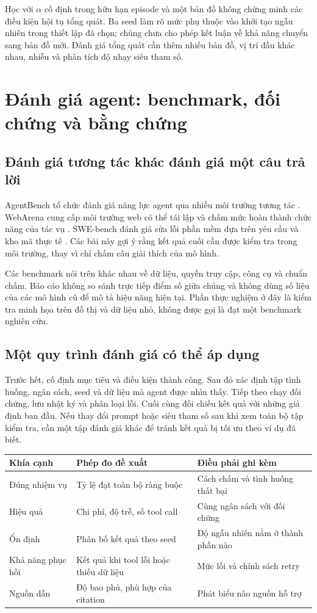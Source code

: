 Học với $\alpha$ cố định trong hữu hạn episode và một bản đồ không chứng minh các điều
kiện hội tụ tổng quát. Ba seed làm rõ mức phụ thuộc vào khởi tạo ngẫu nhiên trong
thiết lập đã chọn; chúng chưa cho phép kết luận về khả năng chuyển sang bản đồ mới.
Đánh giá tổng quát cần thêm nhiều bản đồ, vị trí đầu khác nhau, nhiễu và phân tích
độ nhạy siêu tham số.

\par
\section{Đánh giá agent: benchmark, đối chứng và bằng chứng}
\subsection{Đánh giá tương tác khác đánh giá một câu trả lời}
AgentBench tổ chức đánh giá năng lực agent qua nhiều môi trường tương tác
\cite{agentbench}. WebArena cung cấp môi trường web có thể tái lập và chấm mức hoàn
thành chức năng của tác vụ \cite{webarena}. SWE-bench đánh giá sửa lỗi phần mềm dựa
trên yêu cầu và kho mã thực tế \cite{swebench}. Các bài này gợi ý rằng kết quả cuối
cần được kiểm tra trong môi trường, thay vì chỉ chấm câu giải thích của mô hình.

Các benchmark nói trên khác nhau về dữ liệu, quyền truy cập, công cụ và chuẩn chấm.
Báo cáo không so sánh trực tiếp điểm số giữa chúng và không dùng số liệu của các mô
hình cũ để mô tả hiệu năng hiện tại. Phần thực nghiệm ở đây là kiểm tra minh họa trên
đồ thị và dữ liệu nhỏ, không được gọi là đạt một benchmark nghiên cứu.

\subsection{Một quy trình đánh giá có thể áp dụng}
Trước hết, cố định mục tiêu và điều kiện thành công. Sau đó xác định tập tình huống,
ngân sách, seed và dữ liệu mà agent được nhìn thấy. Tiếp theo chạy đối chứng, lưu
nhật ký và phân loại lỗi. Cuối cùng đối chiếu kết quả với những giả định ban đầu.
Nếu thay đổi prompt hoặc siêu tham số sau khi xem toàn bộ tập kiểm tra, cần một tập
đánh giá khác để tránh kết quả bị tối ưu theo ví dụ đã biết.

\begin{center}\small
\begin{tabularx}{\linewidth}{@{}p{3.0cm}XX@{}}\toprule
\textbf{Khía cạnh} & \textbf{Phép đo đề xuất} & \textbf{Điều phải ghi kèm}\\\midrule
Đúng nhiệm vụ & Tỷ lệ đạt toàn bộ ràng buộc & Cách chấm và tình huống thất bại\\
Hiệu quả & Chi phí, độ trễ, số tool call & Cùng ngân sách với đối chứng\\
Ổn định & Phân bố kết quả theo seed & Độ ngẫu nhiên nằm ở thành phần nào\\
Khả năng phục hồi & Kết quả khi tool lỗi hoặc thiếu dữ liệu & Mức lỗi và chính sách retry\\
Nguồn dẫn & Độ bao phủ, phù hợp của citation & Phát biểu nào nguồn hỗ trợ\\\bottomrule
\end{tabularx}\end{center}

